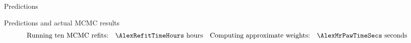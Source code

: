 \begin{frame}[t]{Predictions}
    \AlexanderPredictionFigOne{}
\end{frame}


\begin{frame}[t]{Predictions and actual MCMC results}
    \AlexanderPredictionFigTwo{}
    \vspace{-3em}
    $$
    \begin{aligned}
        \textrm{Running ten MCMC refits:}\quad & \AlexRefitTimeHours \textrm{ hours} &
        \textrm{Computing approximate weights:}\quad &\AlexMrPawTimeSecs \textrm{ seconds}\\
    \end{aligned}
    $$
\end{frame}








